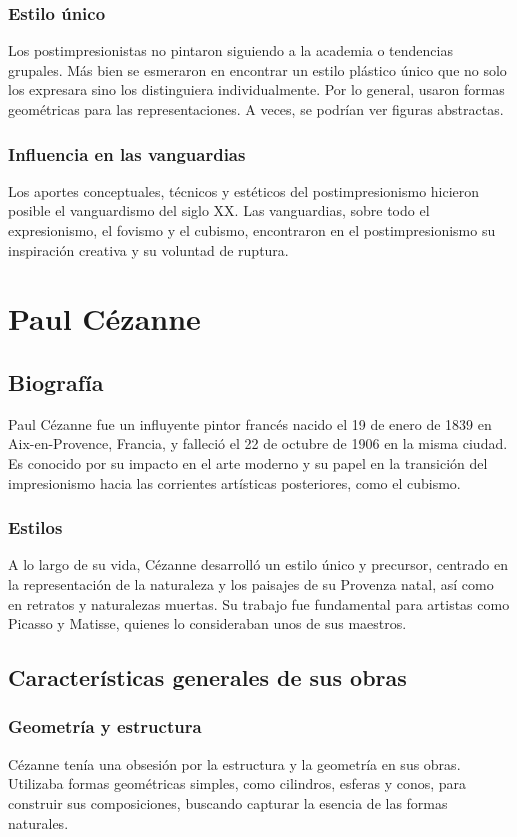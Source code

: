 \documentclass{article}
\begin{document}
\subsubsection{Estilo único}
Los postimpresionistas no pintaron siguiendo a la academia o tendencias grupales. Más bien se esmeraron en encontrar un estilo plástico único que no solo los expresara sino los 
distinguiera individualmente. Por lo general, usaron formas geométricas para las representaciones. A veces, se podrían ver figuras abstractas.

\subsubsection{Influencia en las vanguardias}
Los aportes conceptuales, técnicos y estéticos del postimpresionismo hicieron posible el vanguardismo del siglo XX. Las vanguardias, sobre todo el expresionismo, 
el fovismo y el cubismo, encontraron en el postimpresionismo su inspiración creativa y su voluntad de ruptura.

\section{Paul Cézanne}
\subsection{Biografía}
Paul Cézanne fue un influyente pintor francés nacido el 19 de enero de 1839 en Aix-en-Provence, Francia, y falleció el 22 de octubre de 1906 en la misma ciudad. 
Es conocido por su impacto en el arte moderno y su papel en la transición del impresionismo hacia las corrientes artísticas posteriores, como el cubismo.

\subsubsection{Estilos}
A lo largo de su vida, Cézanne desarrolló un estilo único y precursor, centrado en la representación de la naturaleza y los paisajes de su Provenza natal, 
así como en retratos y naturalezas muertas. Su trabajo fue fundamental para artistas como Picasso y Matisse, quienes lo consideraban unos de sus maestros.

\subsection{Características generales de sus obras}
\subsubsection{Geometría y estructura}
Cézanne tenía una obsesión por la estructura y la geometría en sus obras. Utilizaba formas geométricas simples, como cilindros, esferas y conos, 
para construir sus composiciones, buscando capturar la esencia de las formas naturales.
\end{document}
